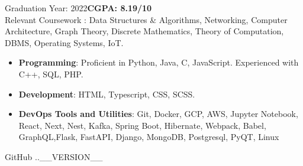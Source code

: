 \documentclass[10pt,a4paper,ragged2e]{classes/altacv}
\begin{document}


Graduation Year: 2022\hspace{5mm}\textbf{CGPA: 8.19/10 }\\
\smallskip
Relevant Coursework : Data Structures \& Algorithms, Networking, Computer Architecture, Graph Theory, Discrete Mathematics, Theory of Computation, DBMS, Operating Systems, IoT.



\smallskip
\begin{itemize}
\item \textbf{Programming}: Proficient in Python, Java, C, JavaScript. Experienced with C++, SQL, PHP.
\smallskip
\item \textbf{Development}: HTML, Typescript, CSS, SCSS.
\smallskip
\item \textbf{DevOps Tools and Utilities}: Git, Docker, GCP, AWS, Jupyter Notebook, React, Next, Nest, Kafka, Spring Boot, Hibernate, Webpack, Babel, GraphQL,Flask, FastAPI, Django, MongoDB, Postgresql, PyQT, Linux  
\smallskip
\end{itemize}

\smallskip
\begin{footnotesize}
GitHub \number \month .\number\year.__VERSION__
\end{footnotesize}
\clearpage
\end{document}
